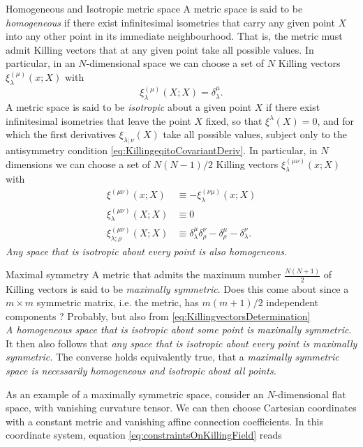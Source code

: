 \begin{mybox}{Homogeneous and Isotropic metric space}
	A metric space is said to be \emph{homogeneous} if there exist infinitesimal isometries that carry any given point $X$ into any other point in its immediate neighbourhood. That is, the metric must admit Killing vectors that at any given point take all possible values. In particular, in an $N$-dimensional space we can choose a set of $N$ Killing vectors $\xi^{(\mu)}_\lambda(x;X)$ with
	\begin{equation} 
	\xi^{(\mu)}_\lambda(X;X)=\delta^\mu_\lambda.
	\end{equation}
	A metric space is said to be \emph{isotropic} about a given point $X$ if there exist infinitesimal isometries that leave the point $X$ fixed, so that $\xi^\lambda(X)=0$, and for which the first derivatives $\xi_{\lambda;\nu}(X)$ take all possible values, subject only to the antisymmetry condition \ref{eq:KillingeqitoCovariantDeriv}. In particular, in $N$ dimensions we can choose a set of $N(N-1)/2$ Killing vectors $\xi^{(\mu \nu)}_\lambda(x;X)$ with
	\begin{align*}
		\xi^{(\mu \nu)} (x;X) &\equiv -\xi^{(\nu \mu)}_\lambda(x;X) \\
		\xi^{(\mu \nu)}_\lambda (X;X) &\equiv 0\\
		\xi^{(\mu \nu)}_{\lambda;\rho}(X;X) &\equiv \delta^\mu_\lambda \delta^\nu_\rho - \delta^\mu_\rho -\delta^\nu_\lambda.
	\end{align*}
\emph{Any space that is isotropic about every point is also homogeneous.}
\end{mybox}
\begin{mybox}{Maximal symmetry}
	A metric that admits the maximum number $\frac{N(N+1)}{2}$ of Killing vectors is said to be \emph{maximally symmetric}. Does this come about since a $m×m$ symmetric matrix, i.e. the metric, has $m(m+1)/2$ independent components ? Probably, but also from \ref{eq:KillingvectorsDetermination}\\
	\emph{A homogeneous space that is isotropic about some point is maximally symmetric}. It then also follows that \emph{any space that is isotropic about every point is maximally symmetric.} The converse holds equivalently true, that a \emph{maximally symmetric space is necessarily homogeneous and isotropic about all points.}
\end{mybox}
As an example of a maximally symmetric space, consider an $N$-dimensional flat space, with vanishing curvature tensor. We can then choose Cartesian coordinates with a constant metric and vanishing affine connection coefficients. In this coordinate system, equation \ref{eq:constraintsOnKillingField} reads

